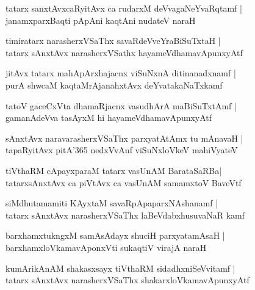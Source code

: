 \documentclass[twoside,12pt,openright]{book}
\newcounter{shloka}[chapter]
\begin{document}
\begin{shloka}
tatarx sanxtAvxcaRyitAvx ca rudarxM deVvagaNeYvaRqtamf |\\
janamxparxBaqti pApAni kaqtAni nudateV naraH
\end{shloka}

\begin{shloka}
timiratarx narasherxVSaThx savaRdeVveYraBiSuTxtaH |\\
tatarx sAnxtAvx narasherxVSathx hayameVdhamavApunxyAtf 
\end{shloka}

\begin{shloka}
jitAvx tatarx mahApArxhajacnx viSuNxnA ditinanadxnamf |\\
purA shwcaM kaqtaMrAjanahxtAvx deYvatakaNaTxkamf 
\end{shloka}

\begin{shloka}
tatoV gaceCxVta dhamaRjacnx vasudhArA maBiSuTxtAmf |\\
gamanAdeVva tasAyxM hi hayameVdhamavApunxyAtf 
\end{shloka}

\begin{shloka}
sAnxtAvx naravarasherxVSaThx parxyatAtAmx tu mAnavaH |\\
tapaRyitAvx pitA\char'365 nedxVvAnf viSuNxloVkeV mahiVyateV 
\end{shloka}

\begin{shloka}
tiVthaRM cApayxparaM tatarx vasUnAM BarataSaRBa|\\
tatarxsAnxtAvx ca piVtAvx ca vasUnAM samamxtoV BaveVtf
\end{shloka}

\begin{shloka}
siMdhutamamiti KAyxtaM savaRpApaparxNAshanamf |\\
tatarx sAnxtAvx narasherxVSaThx laBeVdabxhusuvaNaR kamf 
\end{shloka}

\begin{shloka}
barxhamxtukngxM samAsAdayx shuciH parxyatamAsaH |\\
barxhamxloVkamavAponxVti sukaqtiV virajA naraH 
\end{shloka}

\begin{shloka}
kumArikAnAM shakasxsayx tiVthaRM sidadhxniSeVvitamf |\\
tatarx sAnxtAvx narasherxVSaThx shakarxloVkamavApunxyAtf 
\end{shloka}
\end{document}
